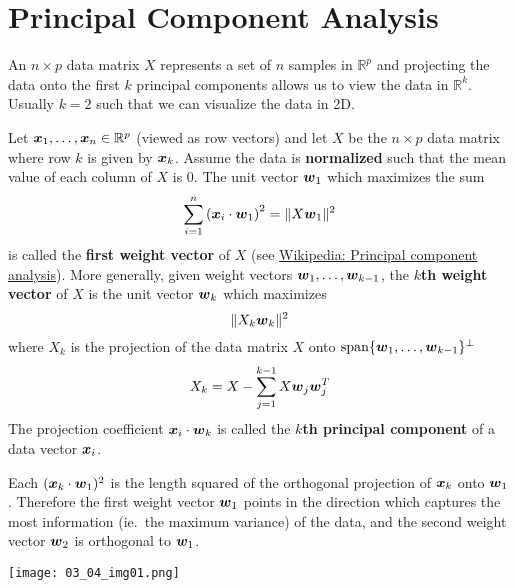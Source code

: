 \section{Principal Component Analysis}

\begin{bigidea}
An $n \times p$ data matrix $X$ represents a set of $n$ samples in $\mathbb{R}^p$ and projecting the data onto the first $k$ principal components allows us to view the data in $\mathbb{R}^k$. Usually $k=2$ such that we can visualize the data in 2D.
\end{bigidea}

\begin{definition}
Let $\boldsymbol{x}_1 , \dots , \boldsymbol{x}_n \in \mathbb{R}^p$ (viewed as row vectors) and let $X$ be the $n \times p$ data matrix where row $k$ is given by $\boldsymbol{x}_k$. Assume the data is {\bf normalized} such that the mean value of each column of $X$ is 0. The unit vector $\boldsymbol{w}_1$ which maximizes the sum
$$
\sum_{i=1}^n \left( \boldsymbol{x}_i \cdot \boldsymbol{w}_1 \right)^2 = \| X \boldsymbol{w}_1 \|^2
$$
is called the {\bf first weight vector} of $X$ (see \href{https://en.wikipedia.org/wiki/Principal_component_analysis}{Wikipedia: Principal component analysis}). More generally, given weight vectors $\boldsymbol{w}_1 , \dots, \boldsymbol{w}_{k-1}$, the {\bf $k$th weight vector} of $X$ is the unit vector $\boldsymbol{w}_k$ which maximizes
$$
\| X_k \boldsymbol{w}_k \|^2
$$
where $X_k$ is the projection of the data matrix $X$ onto $\mathrm{span} \{ \boldsymbol{w}_1 , \dots, \boldsymbol{w}_{k-1} \}^{\perp}$
$$
X_k = X - \sum_{j=1}^{k-1} X \boldsymbol{w}_j \boldsymbol{w}_j^T
$$
The projection coefficient $\boldsymbol{x}_i \cdot \boldsymbol{w}_k$ is called the {\bf $k$th principal component} of a data vector $\boldsymbol{x}_i$.
\end{definition}

\begin{note}
Each $( \boldsymbol{x}_k \cdot \boldsymbol{w}_1 )^2$ is the length squared of the orthogonal projection of $\boldsymbol{x}_k$ onto $\boldsymbol{w}_1$. Therefore the first weight vector $\boldsymbol{w}_1$ points in the direction which captures the most information (ie.~the maximum variance) of the data, and the second weight vector $\boldsymbol{w}_2$ is orthogonal to $\boldsymbol{w}_1$.
\begin{center}
\texttt{[image: 03\_04\_img01.png]}
\end{center}
\end{note}


